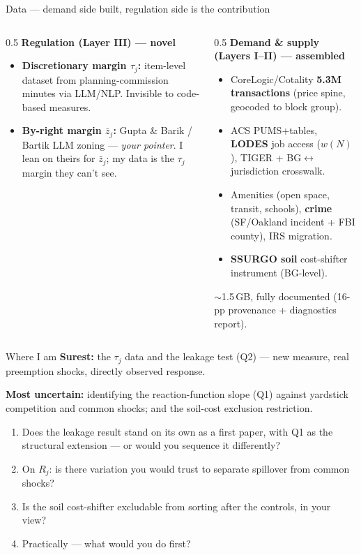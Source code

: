 \documentclass[10pt,aspectratio=169]{beamer}
\begin{document}
\begin{frame}{Data --- demand side built, regulation side is the contribution}
\begin{columns}[T]
\begin{column}{0.5\textwidth}
\textbf{Regulation (Layer III) --- novel}
\begin{itemize}\small
  \item \textbf{Discretionary margin $\tau_j$:} item-level dataset from planning-commission
  minutes via LLM/NLP. \alert{Invisible to code-based measures.}
  \item \textbf{By-right margin $\bar z_j$:} Gupta \& Barik / Bartik LLM zoning --- \emph{your
  pointer}. I lean on theirs for $\bar z_j$; my data is the $\tau_j$ margin they can't see.
\end{itemize}
\end{column}
\begin{column}{0.5\textwidth}
\textbf{Demand \& supply (Layers I--II) --- assembled}
\begin{itemize}\small
  \item CoreLogic/Cotality \textbf{5.3M transactions} (price spine, geocoded to block group).
  \item ACS PUMS+tables, \textbf{LODES} job access ($w(N)$), TIGER + BG$\leftrightarrow$jurisdiction
  crosswalk.
  \item Amenities (open space, transit, schools), \textbf{crime} (SF/Oakland incident + FBI
  county), IRS migration.
  \item \textbf{SSURGO soil} cost-shifter instrument (BG-level).
\end{itemize}
\footnotesize $\sim$1.5\,GB, fully documented (16-pp provenance + diagnostics report).
\end{column}
\end{columns}
\end{frame}

\begin{frame}{Where I am}
\textbf{Surest:} the $\tau_j$ data and the leakage test (Q2) --- new measure, real preemption
shocks, directly observed response.

\smallskip
\textbf{Most uncertain:} identifying the reaction-function slope (Q1) against yardstick
competition and common shocks; and the soil-cost exclusion restriction.

\bigskip
\begin{enumerate}
  \item Does the leakage result stand on its own as a first paper, with Q1 as the structural
  extension --- or would you sequence it differently?
  \item On $R_j$: is there variation you would trust to separate spillover from common shocks?
  \item Is the soil cost-shifter excludable from sorting after the controls, in your view?
  \item Practically --- what would you do first?
\end{enumerate}
\end{frame}
\end{document}
